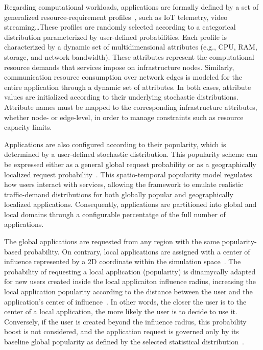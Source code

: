 \documentclass[ASNA]{USG} %
\begin{document}
Regarding computational workloads, applications are formally defined by a set of generalized resource-requirement profiles~\cite{Mechalikh2020PureEdgeSim}, such as IoT telemetry, video streaming\ldots These profiles are randomly selected according to a categorical distribution parameterized by user-defined probabilities. Each profile is characterized by a dynamic set of multidimensional attributes (e.g., CPU, RAM, storage, and network bandwidth). These attributes represent the computational resource demands that services impose on infrastructure nodes. Similarly, communication resource consumption over network edges is modeled for the entire application through a dynamic set of attributes. In both cases, attribute values are initialized according to their underlying stochastic distributions. Attribute names must be mapped to the corresponding infrastructure attributes, whether node- or edge-level, in order to manage constraints such as resource capacity limits.



Applications are also configured according to their popularity, which is determined by a user-defined stochastic distribution. This popularity scheme can be expressed either as a general global request probability or as a geographically localized request probability~\cite{Eramo2017An}. This spatio-temporal popularity model regulates how users interact with services, allowing the framework to emulate realistic traffic-demand distributions for both globally popular and geographically localized applications. Consequently, applications are partitioned into global and local domains through a configurable percentatge of the full number of applications.

The global applications are requested from any region with the same popularity-based probability. On contrary, local applications are assigned with a center of influence represented by a 2D coordinate within the simulation space~\cite{Chen2022Efficient}. The probability of requesting a local application (popularity) is dinamycally adapted for new users created inside the local applicaiton influence radius, increasing the local application popularity according to the distance between the user and the application's center of influence~\cite{Shi2025Dynamic}. In other words, the closer the user is to the center of a local application, the more likely the user is to decide to use it. Conversely, if the user is created beyond the influence radius, this probability boost is not considered, and the application request is governed only by its baseline global popularity as defined by the selected statistical distribution~\cite{Jiang2018User}.
\end{document}
